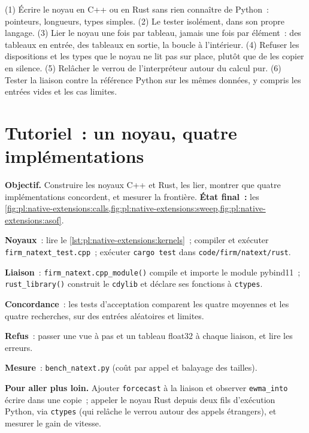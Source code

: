 \begin{method}\label{met:pl:native-extensions:method}
(1) Écrire le noyau en C++ ou en Rust sans rien connaître de Python~: pointeurs, longueurs, types simples. (2) Le tester isolément, dans son propre langage.
(3) Lier le noyau une fois par tableau, jamais une fois par élément~: des tableaux en entrée, des tableaux en sortie, la boucle à l'intérieur. (4) Refuser les dispositions et les types que le noyau
ne lit pas sur place, plutôt que de les copier en silence. (5) Relâcher le verrou de l'interpréteur autour du calcul pur. (6) Tester la liaison
contre la référence Python sur les mêmes données, y compris les entrées vides et les cas limites.
\end{method}

\section{Tutoriel~: un noyau, quatre implémentations}\label{tut:pl:native-extensions:tut}

\begin{tutorial}
\textbf{Objectif.} Construire les noyaux C++ et Rust, les lier, montrer que quatre implémentations concordent, et mesurer la frontière.
\textbf{État final~:} les \cref{fig:pl:native-extensions:calls,fig:pl:native-extensions:sweep,fig:pl:native-extensions:asof}.
\begin{tutsteps}
\item \textbf{Noyaux}~: lire le \cref{lst:pl:native-extensions:kernels}~; compiler et exécuter \texttt{firm\_natext\_test.cpp}~; exécuter
\texttt{cargo test} dans \texttt{code/firm/natext/rust}.
\item \textbf{Liaison}~: \texttt{firm\_natext.cpp\_module()} compile et importe le module pybind11~;
\texttt{rust\_library()} construit le \texttt{cdylib} et déclare ses fonctions à \texttt{ctypes}.
\item \textbf{Concordance}~: les tests d'acceptation comparent les quatre moyennes et les quatre recherches, sur des entrées aléatoires et limites.
\item \textbf{Refus}~: passer une vue à pas et un tableau float32 à chaque liaison, et lire les erreurs.
\item \textbf{Mesure}~: \texttt{bench\_natext.py} (coût par appel et balayage des tailles).
\end{tutsteps}
\textbf{Pour aller plus loin.} Ajouter \texttt{forcecast} à la liaison et observer \texttt{ewma\_into} écrire dans une copie~; appeler le noyau Rust
depuis deux fils d'exécution Python, via \texttt{ctypes} (qui relâche le verrou autour des appels étrangers), et mesurer le gain de vitesse.
\end{tutorial}


